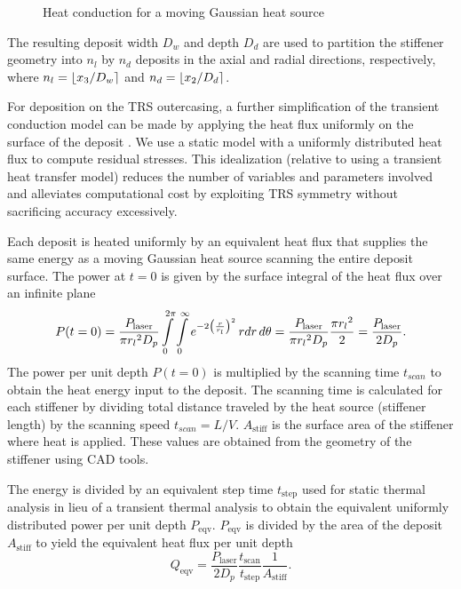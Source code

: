 \begin{figure}[h!]
	\centering
	 \hspace{0.1\textwidth}%
	\caption{Heat conduction for a moving Gaussian heat source}
	\label{fig:gaussian}
\end{figure}

The resulting deposit width $D_w$ and depth $D_d$ are used to partition the stiffener geometry into $n_l$ by $n_d$ deposits in the axial and radial directions, respectively, where $n_l = \lfloor x_3/D_w\rceil$ and $n_d = \lfloor x_2/D_d\rceil$. 

For deposition on the \ac{TRS} outercasing, a further simplification of the transient conduction model can be made by applying the heat flux uniformly on the surface of the deposit \cite{Nickel2001}. We use a static model with a uniformly distributed heat flux to compute residual stresses. This idealization (relative to using a transient heat transfer model) reduces the number of variables and parameters involved and alleviates computational cost by exploiting TRS symmetry without sacrificing accuracy excessively.

Each deposit is heated uniformly by an equivalent heat flux that supplies the same energy as a moving Gaussian heat source scanning the entire deposit surface. The power at $t=0$ is given by the surface integral of the heat flux over an infinite plane
%
\begin{equation}
	\label{eq:power}
	P(t=0) = \dfrac{P_{\textrm{laser}}}{\pi{r_l}^2 D_p} \int\limits_{0}^{2\pi} \int\limits_{0}^{\infty} e^{-2\left(\frac{r}{r_l}\right)^2} \,rdr\,d\theta = \dfrac{P_{\textrm{laser}}}{\pi{r_l}^2 D_p}\dfrac{\pi{r_l}^2}{2} = \dfrac{P_{\textrm{laser}}}{2D_p}.
\end{equation}
%
The power per unit depth $P(t=0)$ is multiplied by the scanning time $t_{scan}$ to obtain the heat energy input to the deposit. The scanning time is calculated for each stiffener by dividing total distance traveled by the heat source (stiffener length) by the scanning speed $t_{scan} = L/V$. $A_{\textrm{stiff}}$ is the surface area of the stiffener where heat is applied. These values are obtained from the geometry of the stiffener using \ac{CAD} tools.

The energy is divided by an equivalent step time $t_{\textrm{step}}$ used for static thermal analysis in lieu of a transient thermal analysis to obtain the equivalent uniformly distributed power per unit depth $P_{\textrm{eqv}}$. $P_{\textrm{eqv}}$ is divided by the area of the deposit $A_{\textrm{stiff}}$ to yield the equivalent heat flux per unit depth
%
\begin{equation}
	\label{eq:powereqv}
	Q_{\textrm{eqv}} = \dfrac{P_{\textrm{laser}}}{2D_{p}}\dfrac{t_{\textrm{scan}}}{t_{\textrm{step}}}\dfrac{1}{A_{\textrm{stiff}}}.
\end{equation}

